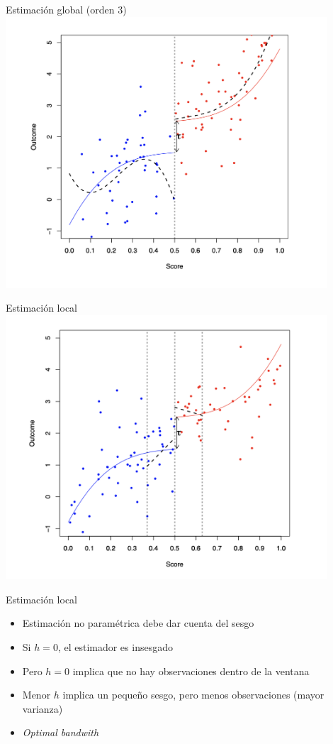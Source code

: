\documentclass[
  ignorenonframetext,
]{beamer}
\providecommand{\tightlist}{%
  \setlength{\itemsep}{0pt}\setlength{\parskip}{0pt}}
\begin{document}
\begin{frame}{Estimación global (orden 3)}
\protect\hypertarget{estimaciuxf3n-global-orden-3}{}
\includegraphics[width=0.9\textwidth,height=\textheight]{p3}
\end{frame}

\begin{frame}{Estimación local}
\protect\hypertarget{estimaciuxf3n-local}{}
\includegraphics[width=0.9\textwidth,height=\textheight]{llr}
\end{frame}

\begin{frame}{Estimación local}
\protect\hypertarget{estimaciuxf3n-local-1}{}
\begin{itemize}
\tightlist
\item
  Estimación no paramétrica debe dar cuenta del sesgo
\item
  Si \(h=0\), el estimador es insesgado
\item
  Pero \(h=0\) implica que no hay observaciones dentro de la ventana
\item
  Menor \(h\) implica un pequeño sesgo, pero menos observaciones (mayor
  varianza)
\item
  \emph{Optimal bandwith}
\end{itemize}
\end{frame}
\end{document}
